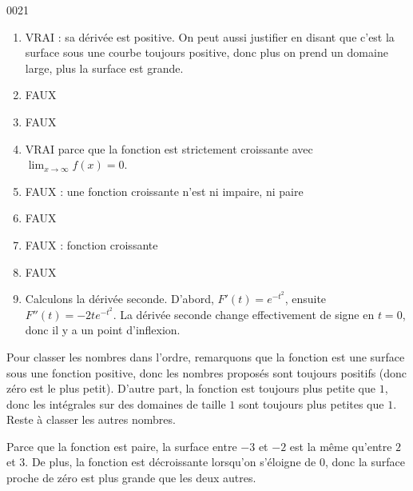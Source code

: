 \begin{corrige}{0021}

\begin{enumerate}

\item
VRAI : sa dérivée est positive. On peut aussi justifier en disant que c'est la surface sous une courbe toujours positive, donc plus on prend un domaine large, plus la surface est grande.

\item
FAUX
\item
FAUX
\item
VRAI parce que la fonction est strictement croissante avec $\lim_{x\to\infty}f(x)=0$.
\item
FAUX : une fonction croissante n'est ni impaire, ni paire
\item
FAUX
\item
FAUX : fonction croissante
\item
FAUX
\item
Calculons la dérivée seconde. D'abord, $F'(t)= e^{-t^2}$, ensuite $F''(t)=-2t e^{-t^2}$. La dérivée seconde change effectivement de signe en $t=0$, donc il y a un point d'inflexion.

\end{enumerate}

Pour classer les nombres dans l'ordre, remarquons que la fonction est une surface sous une fonction positive, donc les nombres proposés sont toujours positifs (donc zéro est le plus petit). D'autre part, la fonction est toujours plus petite que $1$, donc les intégrales sur des domaines de taille $1$ sont toujours plus petites que $1$. Reste à classer les autres nombres.

Parce que la fonction est paire, la surface entre $-3$ et $-2$ est la même qu'entre $2$ et $3$. De plus, la fonction est décroissante lorsqu'on s'éloigne de $0$, donc la surface proche de zéro est plus grande que les deux autres.

\end{corrige}
